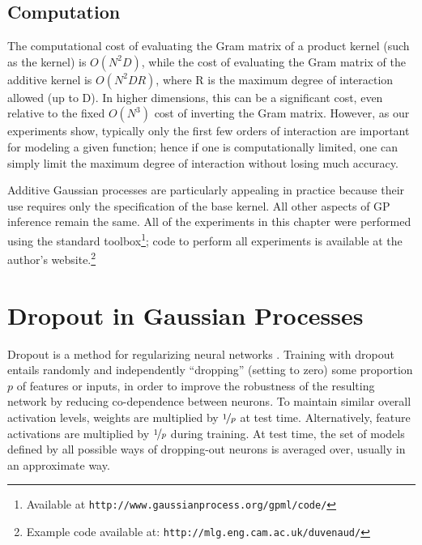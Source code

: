 

\subsection{Computation}
The computational cost of evaluating the Gram matrix of a product kernel (such as the \kSE{} kernel) is $O(N^2D)$, while the cost of evaluating the Gram matrix of the additive kernel is $O(N^2DR)$, where R is the maximum degree of interaction allowed (up to D).
In higher dimensions, this can be a significant cost, even relative to the fixed $O(N^3)$ cost of inverting the Gram matrix.
%
However, as our experiments show, typically only the first few orders of interaction are important for modeling a given function; hence if one is computationally limited, one can simply limit the maximum degree of interaction without losing much accuracy.

Additive Gaussian processes are particularly appealing in practice because their use requires only the specification of the base kernel.  All other aspects of GP inference remain the same.  All of the experiments in this chapter were performed using the standard \GPML{} toolbox\footnote{Available at \texttt{http://www.gaussianprocess.org/gpml/code/}};
code to perform all experiments is available at the author's website.\footnote{Example code available at: \texttt{http://mlg.eng.cam.ac.uk/duvenaud/}}





\section{Dropout in Gaussian Processes}

Dropout is a method for regularizing neural networks \citep{hinton2012improving, srivastava2013improving}.
Training with dropout entails randomly and independently ``dropping'' (setting to zero) some proportion $p$ of features or inputs, in order to improve the robustness of the resulting network by reducing co-dependence between neurons.
To maintain similar overall activation levels, weights are multiplied by $\nicefrac{1}{p}$ at test time. Alternatively, feature activations are multiplied by $\nicefrac{1}{p}$ during training.
At test time, the set of models defined by all possible ways of dropping-out neurons is averaged over, usually in an approximate way.

